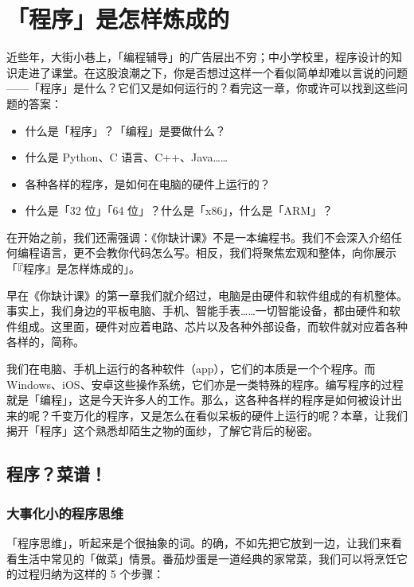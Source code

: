 \chapter{「程序」是怎样炼成的}
\label{cha:program-and-arch}

\begin{intro}
  近些年，大街小巷上，「编程辅导」的广告层出不穷；中小学校里，程序设计的知识走进了课堂。在这股浪潮之下，你是否想过这样一个看似简单却难以言说的问题——「程序」是什么？它们又是如何运行的？看完这一章，你或许可以找到这些问题的答案：

  \begin{itemize}
    \item 什么是「程序」？「编程」是要做什么？
    \item 什么是 Python、C 语言、C++、Java……
    \item 各种各样的程序，是如何在电脑的硬件上运行的？
    \item 什么是「32 位」「64 位」？什么是「x86」，什么是「ARM」？
  \end{itemize}

  在开始之前，我们还需强调：《你缺计课》不是一本编程书。我们不会深入介绍任何编程语言，更不会教你代码怎么写。相反，我们将聚焦宏观和整体，向你展示「『程序』是怎样炼成的」。
\end{intro}

早在《你缺计课》的第一章我们就介绍过，电脑是由硬件和软件组成的有机整体。事实上，我们身边的平板电脑、手机、智能手表……一切智能设备，都由硬件和软件组成。这里面，硬件对应着电路、芯片以及各种外部设备，而软件就对应着各种各样的，简称。

我们在电脑、手机上运行的各种软件（app），它们的本质是一个个程序。而 Windows、iOS、安卓这些操作系统，它们亦是一类特殊的程序。编写程序的过程就是「编程」，这是今天许多人的工作。那么，这各种各样的程序是如何被设计出来的呢？千变万化的程序，又是怎么在看似呆板的硬件上运行的呢？本章，让我们揭开「程序」这个熟悉却陌生之物的面纱，了解它背后的秘密。

\section{程序？菜谱！}

\subsection{大事化小的程序思维}

「程序思维」，听起来是个很抽象的词。的确，不如先把它放到一边，让我们来看看生活中常见的「做菜」情景。番茄炒蛋是一道经典的家常菜，我们可以将烹饪它的过程归纳为这样的 5 个步骤：

